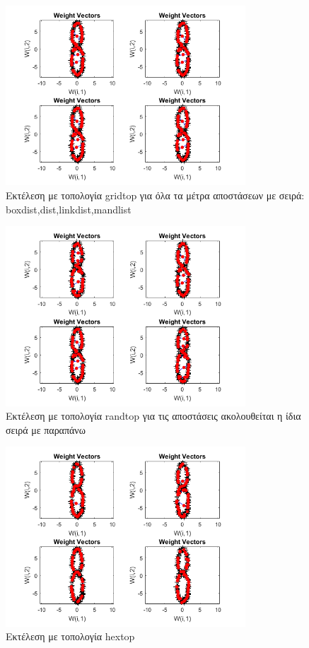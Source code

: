 \documentclass[12pt]{article}
\begin{document}
		\begin{figure}[H]
	 		\centering
			\includegraphics[width=0.8\textwidth]{fakelos/gridtop_eight.png}
			\caption{Εκτέλεση με τοπολογία gridtop για όλα τα μέτρα αποστάσεων με σειρά: boxdist,dist,linkdist,mandlist} 	  
			\label{fig:2}
		\end{figure} 
		\begin{figure}[H]
	 		\centering
			\includegraphics[width=0.8\textwidth]{fakelos/hextop_eight.png}
			\caption{Εκτέλεση με τοπολογία randtop για τις αποστάσεις ακολουθείται η ίδια σειρά με παραπάνω} 	  
			\label{fig:2}
		\end{figure} 		
		\begin{figure}[H]
	 		\centering
			\includegraphics[width=0.8\textwidth]{fakelos/randtop_eight.png}
			\caption{Εκτέλεση με τοπολογία hextop} 	  
			\label{fig:2}
		\end{figure}
\end{document}
